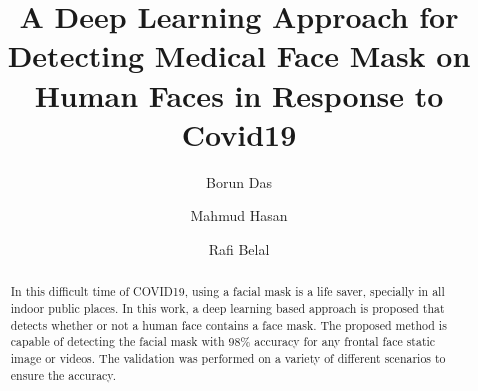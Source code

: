 \documentclass{svproc}
\begin{document}
\mainmatter              %
%
\title{A Deep Learning Approach for Detecting Medical Face Mask on Human Faces in Response to Covid19}
%
%
\author{Borun Das \and Mahmud Hasan \and Rafi Belal }
%
%
%
\maketitle              %

\begin{abstract}
In this difficult time of COVID19, using a facial mask is a life saver, specially in all indoor public places. In this work, a deep learning based approach is proposed that detects whether or not a human face contains a face mask. The proposed method is capable of detecting the facial mask with $98\%$ accuracy for any frontal face static image or videos. The validation was performed on a variety of different scenarios to ensure the accuracy.
\end{abstract}
%
\end{document}
